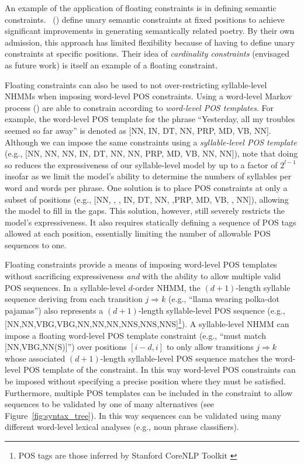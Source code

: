 \documentclass[phd,electronic,oneside,twosidetoc,letterpaper,chaptercenter,parttop,lol,lof,lot]{byumsphd}
\begin{document}
An example of the application of floating constraints is in defining semantic constraints. \citeauthor{barbieri2012markov}~(\citeyear{barbieri2012markov}) define unary semantic constraints at fixed positions to achieve significant improvements in generating semantically related poetry. By their own admission, this approach has limited flexibility because of having to define unary constraints at specific positions. Their idea of \textit{cardinality constraints} (envisaged as future work) is itself an example of a floating constraint.

Floating constraints can also be used to not over-restricting syllable-level NHMMs when imposing word-level POS constraints. Using a word-level Markov process \citeauthor{barbieri2012markov} (\citeyear{barbieri2012markov}) are able to constrain according to \textit{word-level POS templates}. For example, the word-level POS template for the phrase ``Yesterday, all my troubles seemed so far away'' is denoted as [NN, IN, DT, NN, PRP, MD, VB, NN]. Although we can impose the same constraints using a \textit{syllable-level POS template} (e.g., [NN, NN, NN, IN, DT, NN, NN, PRP, MD, VB, NN, NN]), note that doing so reduces the expressiveness of our syllable-level model by up to a factor of $2^{l-1}$ insofar as we limit the model's ability to determine the numbers of syllables per word and words per phrase. One solution is to place POS constraints at only a subset of positions (e.g., [NN, , , IN, DT, NN, ,PRP, MD, VB, , NN]), allowing the model to fill in the gaps. This solution, however, still severely restricts the model's expressiveness. It also requires statically defining a sequence of POS tags allowed at each position, essentially limiting the number of allowable POS sequences to one.

Floating constraints provide a means of imposing word-level POS templates without sacrificing expressiveness \textit{and} with the ability to allow multiple valid POS sequences. In a syllable-level $d$-order NHMM, the $(d + 1)$-length syllable sequence deriving from each transition $j \Rightarrow k$ (e.g., ``llama wearing polka-dot pajamas'') also represents a $(d+1)$-length syllable-level POS sequence (e.g., {[NN,NN,VBG,VBG,NN,NN,NN,NNS,NNS,NNS]}\footnote{\label{note1}POS tags are those inferred by Stanford CoreNLP Toolkit \cite{Manning2014}}). A syllable-level NHMM can impose a floating word-level POS template constraint (e.g., ``must match {[NN,VBG,NN(S)]}'') over positions $[i-d,i]$ to only allow transitions $j \Rightarrow k$ whose associated $(d+1)$-length syllable-level POS sequence matches the word-level POS template of the constraint. In this way word-level POS constraints can be imposed without specifying a precise position where they must be satisfied. Furthermore, multiple POS templates can be included in the constraint to allow sequences to be validated by one of many alternatives (see Figure~\ref{fig:syntax_tree}). In this way sequences can be validated using many different word-level lexical analyses (e.g., noun phrase classifiers).
\end{document}
